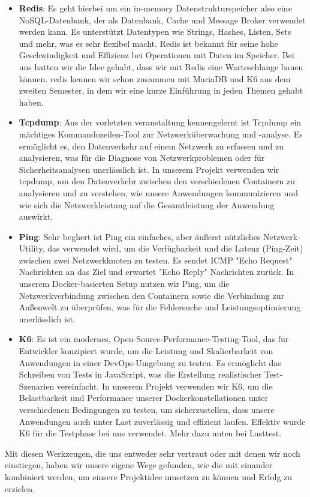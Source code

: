\begin{itemize}
\item \textbf{Redis}: Es geht hierbei um ein in-memory Datenstrukturspeicher also eine NoSQL-Datenbank, der als Datenbank, Cache und Message Broker verwendet werden kann. Es unterstützt Datentypen wie Strings, Hashes, Listen, Sets und mehr, was es sehr flexibel macht. Redis ist bekannt für seine hohe Geschwindigkeit und Effizienz bei Operationen mit Daten im Speicher. Bei uns hatten wir die Idee gehabt, dass wir mit Redis eine Warteschlange bauen können. redis kennen wir schon zusammen mit MariaDB und K6 aus dem zweiten Semester, in dem wir eine kurze Einführung in jeden Themen gehabt haben.

\item \textbf{Tcpdump}: Aus der vorletzten veranstaltung kennengelernt ist Tcpdump ein mächtiges Kommandozeilen-Tool zur Netzwerküberwachung und -analyse. Es ermöglicht es, den Datenverkehr auf einem Netzwerk zu erfassen und zu analysieren, was für die Diagnose von Netzwerkproblemen oder für Sicherheitsanalysen unerlässlich ist. In unserem Projekt verwenden wir tcpdump, um den Datenverkehr zwischen den verschiedenen Containern zu analysieren und zu verstehen, wie unsere Anwendungen kommunizieren und wie sich die Netzwerkleistung auf die Gesamtleistung der Anwendung auswirkt.

\item \textbf{Ping}: Sehr beghert ist Ping ein einfaches, aber äußerst nützliches Netzwerk-Utility, das verwendet wird, um die Verfügbarkeit und die Latenz (Ping-Zeit) zwischen zwei Netzwerkknoten zu testen. Es sendet ICMP "Echo Request" Nachrichten an das Ziel und erwartet "Echo Reply" Nachrichten zurück. In unserem Docker-basierten Setup nutzen wir Ping, um die Netzwerkverbindung zwischen den Containern sowie die Verbindung zur Außenwelt zu überprüfen, was für die Fehlersuche und Leistungsoptimierung unerlässlich ist.

\item \textbf{K6}: Es ist ein modernes, Open-Source-Performance-Testing-Tool, das für Entwickler konzipiert wurde, um die Leistung und Skalierbarkeit von Anwendungen in einer DevOps-Umgebung zu testen. Es ermöglicht das Schreiben von Tests in JavaScript, was die Erstellung realistischer Test-Szenarien vereinfacht. In unserem Projekt verwenden wir K6, um die Belastbarkeit und Performance unserer Dockerkonstellationen unter verschiedenen Bedingungen zu testen, um sicherzustellen, dass unsere Anwendungen auch unter Last zuverlässig und effizient laufen. Effektiv wurde K6 für die Testphase bei uns verwendet. Mehr dazu unten bei Lasttest.

\end{itemize}

Mit diesen Werkzeugen, die uns entweder sehr vertraut oder mit denen wir noch einstiegen, haben wir unsere eigene Wege gefunden, wie die mit einander kombiniert werden, um einsere Projektidee umsetzen zu können und Erfolg zu erzielen. 
